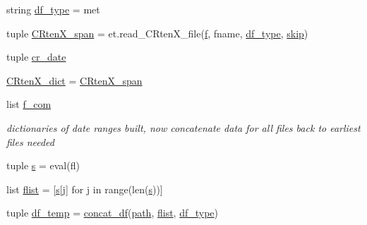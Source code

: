 \begin{DoxyCompactItemize}
string \hyperlink{namespace_date___ranges___concat__script_ac33a88b539edf5ce073799879c45e2e8}{df\+\_\+type} = \textquotesingle{}met\textquotesingle{}
\item 
tuple \hyperlink{namespace_date___ranges___concat__script_a14993873c47661e76372d5bf18cc9384}{C\+Rten\+X\+\_\+span} = et.\+read\+\_\+\+C\+Rten\+X\+\_\+file(\hyperlink{namespace_date___ranges___concat__script_ad5658856a51a27b2b1e1471fc153ad62}{f}, fname, \hyperlink{namespace_date___ranges___concat__script_ac33a88b539edf5ce073799879c45e2e8}{df\+\_\+type}, \hyperlink{namespace_date___ranges___concat__script_a68d09e2180475d8aa358ed77f0e0c076}{skip})
\item 
tuple \hyperlink{namespace_date___ranges___concat__script_a7c53ccead2ad1f6ae8d72f94e8742a5f}{cr\+\_\+date}
\item 
\hyperlink{namespace_date___ranges___concat__script_ab3db8ce6ea71d1628a0e07ede31f9548}{C\+Rten\+X\+\_\+dict} = \hyperlink{namespace_date___ranges___concat__script_a14993873c47661e76372d5bf18cc9384}{C\+Rten\+X\+\_\+span}
\item 
list \hyperlink{namespace_date___ranges___concat__script_a539ab90a74797782c7eaa55a47384597}{f\+\_\+com}
\begin{DoxyCompactList}\small\item\em dictionaries of date ranges built, now concatenate data for all files back to earliest files needed \end{DoxyCompactList}\item 
tuple \hyperlink{namespace_date___ranges___concat__script_a068b2f68f66799aba475185bfe305eca}{s} = eval(fl)
\item 
list \hyperlink{namespace_date___ranges___concat__script_a85f8f04b5018cab654cd0912d726418c}{flist} = \mbox{[}\hyperlink{namespace_date___ranges___concat__script_a068b2f68f66799aba475185bfe305eca}{s}\mbox{[}j\mbox{]} for j in range(len(\hyperlink{namespace_date___ranges___concat__script_a068b2f68f66799aba475185bfe305eca}{s}))\mbox{]}
\item 
tuple \hyperlink{namespace_date___ranges___concat__script_ac8906280d8951e2a35e0bfab0023e8ff}{df\+\_\+temp} = \hyperlink{namespace_date___ranges___concat__script_ad955506c0e46fb40847aab5fd1059336}{concat\+\_\+df}(\hyperlink{namespace_date___ranges___concat__script_a8333f861dcf7a2c4d8513c76222f5c6a}{path}, \hyperlink{namespace_date___ranges___concat__script_a85f8f04b5018cab654cd0912d726418c}{flist}, \hyperlink{namespace_date___ranges___concat__script_ac33a88b539edf5ce073799879c45e2e8}{df\+\_\+type})
\item 

\end{DoxyCompactItemize}
